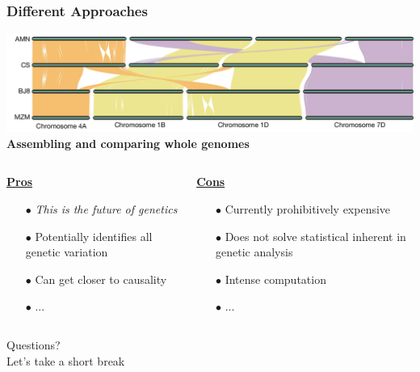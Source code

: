 \documentclass{beamer}
\begin{document}
	
	\begin{frame}
		\frametitle{Different Approaches}
		
		\includegraphics[keepaspectratio, width  = \textwidth]{img/wheatPangenome}\\
		\vspace{10pt}
		\centering \textbf{		\Large Assembling and comparing whole genomes}
		\vspace{10pt}
		\begin{columns}
			\begin{column}{0.5\textwidth}
				\centering			\underline{\textbf{Pros}}
				\begin{itemize}
					\item[$\bullet$] \textit{This is the future of genetics}
					\item[$\bullet$] Potentially identifies all genetic variation 
					\item[$\bullet$] Can get closer to causality
					\item[$\bullet$] ... 
				\end{itemize}
			\end{column}
			\begin{column}{0.5\textwidth}
				\centering			\underline{\textbf{Cons}}
				\begin{itemize}
					\item[$\bullet$] Currently prohibitively expensive
					\item[$\bullet$] Does not solve statistical inherent in genetic analysis
					\item[$\bullet$] Intense computation
					\item[$\bullet$] ... 
				\end{itemize}
			\end{column}
			
			
		\end{columns}
		
		
	\end{frame}
	

	
	
	\begin{frame}

		\Huge
		Questions? \\ \pause
		Let's take a short break
		
	\end{frame}
	
\end{document}
